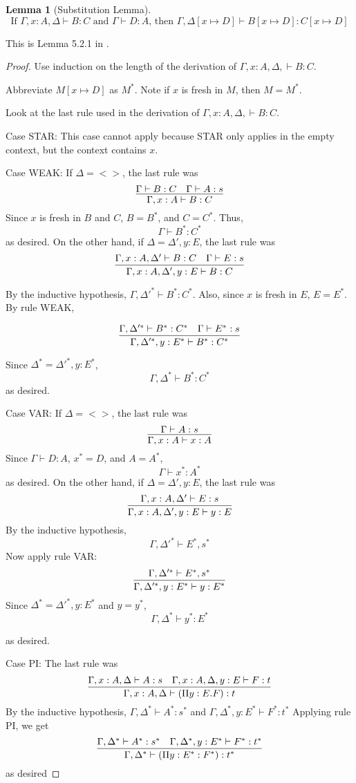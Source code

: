 \documentclass{article}
\newtheorem{lemma}{Lemma}
\begin{document}
\begin{lemma}[Substitution Lemma]
  \[\text{If $\Gamma,x:A,\Delta\vdash B:C$ and $\Gamma\vdash D:A$, then $\Gamma,\Delta[x\mapsto D]\vdash B[x\mapsto D]:C[x\mapsto D]$}\]
\end{lemma}
This is Lemma 5.2.1 in \cite{Barendregt92}.
\begin{proof}
  Use induction on the length of the derivation of $\Gamma,x:A,\Delta,\vdash B:C$.

  Abbreviate $M[x\mapsto D]$ as $M^*$. Note if $x$ is fresh in $M$, then $M=M^*$.

  Look at the last rule used in the derivation of $\Gamma,x:A,\Delta,\vdash B:C$.
  
  Case STAR: This case cannot apply because STAR only applies in the empty context, but the context contains $x$.

  Case WEAK: If $\Delta=<>$, the last rule was
  \[\infer{\Gamma,x:A\vdash B:C}{\Gamma\vdash B:C & \Gamma\vdash A:s}\]
  Since $x$ is fresh in $B$ and $C$, $B=B^*$, and $C=C^*$. Thus,
  \[\Gamma\vdash B^*:C^*\]
  as desired.
  On the other hand, if $\Delta=\Delta',y:E$, the last rule was
  \[\infer{\Gamma,x:A,\Delta',y:E\vdash B:C}{\Gamma,x:A,\Delta'\vdash B:C & \Gamma\vdash E:s}\]

  By the inductive hypothesis, $\Gamma,\Delta'^*\vdash B^*:C^*$. Also, since $x$ is fresh in $E$, $E=E^*$. By rule WEAK,

  \[\infer{\Gamma,\Delta'^*,y:E^*\vdash B^*:C^*}{\Gamma,\Delta'^*\vdash B^*:C^* & \Gamma\vdash E^*:s}\]

  Since $\Delta^*=\Delta'^*,y:E^*$,
  \[\Gamma,\Delta^*\vdash B^*:C^*\]
  as desired.

  Case VAR: If $\Delta=<>$, the last rule was
  \[\infer{\Gamma,x:A\vdash x:A}{\Gamma\vdash A:s}\]
  Since $\Gamma\vdash D:A$, $x^*=D$, and $A=A^*$,
  \[\Gamma\vdash x^*:A^*\]
  as desired.
  On the other hand, if $\Delta=\Delta',y:E$, the last rule was
  \[\infer{\Gamma,x:A,\Delta',y:E\vdash y:E}{\Gamma,x:A,\Delta'\vdash E:s}\]
  By the inductive hypothesis,
  \[\Gamma,\Delta'^*\vdash E^*,s^*\]
  Now apply rule VAR:
  \[\infer{\Gamma,\Delta'^*,y:E^*\vdash y:E^*}{\Gamma,\Delta'^*\vdash E^*,s^*}\]
  Since $\Delta^*=\Delta'^*,y:E^*$ and $y=y^*$,
  \[\Gamma,\Delta^*\vdash y^*:E^*\]
  
  as desired.

  Case PI: The last rule was
  \[\infer{\Gamma,x:A,\Delta\vdash(\Pi y:E.F):t}{\Gamma,x:A,\Delta\vdash A:s & \Gamma,x:A,\Delta,y:E\vdash F:t}\]
  By the inductive hypothesis, $\Gamma,\Delta^*\vdash A^*:s^*$ and $\Gamma,\Delta^*,y:E^*\vdash F^*:t^*$
  Applying rule PI, we get
  \[\infer{\Gamma,\Delta^*\vdash (\Pi y:E^*:F^*):t^*}{\Gamma,\Delta^*\vdash A^*:s^* & \Gamma,\Delta^*,y:E^*\vdash F^*:t^*}\]
  as desired


\end{proof}
\end{document}
